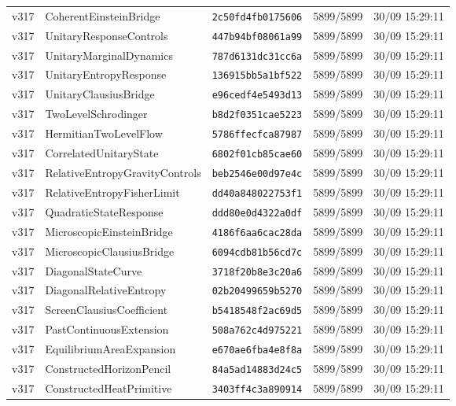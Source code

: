 \documentclass[11pt]{article}
\theoremstyle{definition}\newtheorem{deriv}{Derivation}
\begin{document}
{\begin{longtable}{@{}lllll@{}}
v317 & CoherentEinsteinBridge & \texttt{2c50fd4fb0175606} & 5899/5899 & 30/09 15:29:11 \\
v317 & UnitaryResponseControls & \texttt{447b94bf08061a99} & 5899/5899 & 30/09 15:29:11 \\
v317 & UnitaryMarginalDynamics & \texttt{787d6131dc31cc6a} & 5899/5899 & 30/09 15:29:11 \\
v317 & UnitaryEntropyResponse & \texttt{136915bb5a1bf522} & 5899/5899 & 30/09 15:29:11 \\
v317 & UnitaryClausiusBridge & \texttt{e96cedf4e5493d13} & 5899/5899 & 30/09 15:29:11 \\
v317 & TwoLevelSchrodinger & \texttt{b8d2f0351cae5223} & 5899/5899 & 30/09 15:29:11 \\
v317 & HermitianTwoLevelFlow & \texttt{5786ffecfca87987} & 5899/5899 & 30/09 15:29:11 \\
v317 & CorrelatedUnitaryState & \texttt{6802f01cb85cae60} & 5899/5899 & 30/09 15:29:11 \\
v317 & RelativeEntropyGravityControls & \texttt{beb2546e00d97e4c} & 5899/5899 & 30/09 15:29:11 \\
v317 & RelativeEntropyFisherLimit & \texttt{dd40a848022753f1} & 5899/5899 & 30/09 15:29:11 \\
v317 & QuadraticStateResponse & \texttt{ddd80e0d4322a0df} & 5899/5899 & 30/09 15:29:11 \\
v317 & MicroscopicEinsteinBridge & \texttt{4186f6aa6cac28da} & 5899/5899 & 30/09 15:29:11 \\
v317 & MicroscopicClausiusBridge & \texttt{6094cdb81b56cd7c} & 5899/5899 & 30/09 15:29:11 \\
v317 & DiagonalStateCurve & \texttt{3718f20b8e3c20a6} & 5899/5899 & 30/09 15:29:11 \\
v317 & DiagonalRelativeEntropy & \texttt{02b20499659b5270} & 5899/5899 & 30/09 15:29:11 \\
v317 & ScreenClausiusCoefficient & \texttt{b5418548f2ac69d5} & 5899/5899 & 30/09 15:29:11 \\
v317 & PastContinuousExtension & \texttt{508a762c4d975221} & 5899/5899 & 30/09 15:29:11 \\
v317 & EquilibriumAreaExpansion & \texttt{e670ae6fba4e8f8a} & 5899/5899 & 30/09 15:29:11 \\
v317 & ConstructedHorizonPencil & \texttt{84a5ad14883d24c5} & 5899/5899 & 30/09 15:29:11 \\
v317 & ConstructedHeatPrimitive & \texttt{3403ff4c3a890914} & 5899/5899 & 30/09 15:29:11 \\

\end{longtable}}
\end{document}
